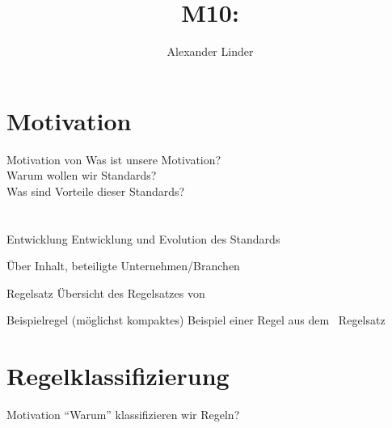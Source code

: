 \documentclass{beamer}
\title{M10: \sqss}
\author[Linder]{Alexander Linder}
\date{} %
\institute{FAKULTÄT FÜR INFORMATIK}
\begin{document}

    \begin{frame}
        \maketitle
    \end{frame}

    \begin{frame}
        \tableofcontents
    \end{frame}

    \section{Motivation}
    \label{sec:motivation}
    \begin{frame}{Motivation von \sqss}
        Was ist unsere Motivation?\\
        Warum wollen wir Standards?\\
        Was sind Vorteile dieser Standards?
    \end{frame}

    \section{\misra}
    \label{sec:misra-c}
    \begin{frame}{Entwicklung}
        Entwicklung und Evolution des Standards
    \end{frame}

    \begin{frame}{Über \misra}
        Inhalt, beteiligte Unternehmen/Branchen
    \end{frame}

    \begin{frame}{Regelsatz}
        Übersicht des Regelsatzes von \misra\
    \end{frame}

    \begin{frame}{Beispielregel}
        (möglichst kompaktes) Beispiel einer Regel aus dem \misra\ Regelsatz
    \end{frame}

    \section{Regelklassifizierung}
    \label{sec:regelklassifizierung}
    \begin{frame}{Motivation}
        \enquote{Warum} klassifizieren wir Regeln?
    \end{frame}
\end{document}
